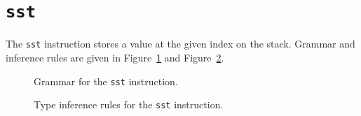 \section{\texttt{sst}}\label{sec:nstar-instructionset-sst}

The \texttt{sst} instruction stores a value at the given index on the stack.
Grammar and inference rules are given in Figure~\ref{fig:nstar-instructionset-sst-grammar} and Figure~\ref{fig:nstar-instructionset-sst-typerules}.

\begin{figure}[H]
  \centering


  \caption{Grammar for the \texttt{sst} instruction.}
  \label{fig:nstar-instructionset-sst-grammar}
\end{figure}

\begin{figure}[H]
  \centering



  \caption{Type inference rules for the \texttt{sst} instruction.}
  \label{fig:nstar-instructionset-sst-typerules}
\end{figure}

